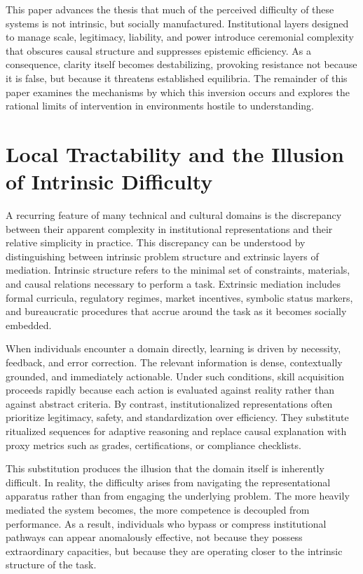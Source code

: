 \documentclass[12pt]{article}
\begin{document}
This paper advances the thesis that much of the perceived difficulty of these systems is not intrinsic, but socially manufactured. Institutional layers designed to manage scale, legitimacy, liability, and power introduce ceremonial complexity that obscures causal structure and suppresses epistemic efficiency. As a consequence, clarity itself becomes destabilizing, provoking resistance not because it is false, but because it threatens established equilibria. The remainder of this paper examines the mechanisms by which this inversion occurs and explores the rational limits of intervention in environments hostile to understanding.

\section{Local Tractability and the Illusion of Intrinsic Difficulty}

A recurring feature of many technical and cultural domains is the discrepancy between their apparent complexity in institutional representations and their relative simplicity in practice. This discrepancy can be understood by distinguishing between intrinsic problem structure and extrinsic layers of mediation. Intrinsic structure refers to the minimal set of constraints, materials, and causal relations necessary to perform a task. Extrinsic mediation includes formal curricula, regulatory regimes, market incentives, symbolic status markers, and bureaucratic procedures that accrue around the task as it becomes socially embedded.

When individuals encounter a domain directly, learning is driven by necessity, feedback, and error correction. The relevant information is dense, contextually grounded, and immediately actionable. Under such conditions, skill acquisition proceeds rapidly because each action is evaluated against reality rather than against abstract criteria. By contrast, institutionalized representations often prioritize legitimacy, safety, and standardization over efficiency. They substitute ritualized sequences for adaptive reasoning and replace causal explanation with proxy metrics such as grades, certifications, or compliance checklists.

This substitution produces the illusion that the domain itself is inherently difficult. In reality, the difficulty arises from navigating the representational apparatus rather than from engaging the underlying problem. The more heavily mediated the system becomes, the more competence is decoupled from performance. As a result, individuals who bypass or compress institutional pathways can appear anomalously effective, not because they possess extraordinary capacities, but because they are operating closer to the intrinsic structure of the task.
\end{document}
